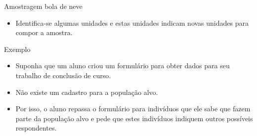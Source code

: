 \documentclass[
  ignorenonframetext,
  serif,
  professionalfont,
  usenames,
  dvipsnames,
  aspectratio = 169]{beamer}
\providecommand{\tightlist}{%
  \setlength{\itemsep}{0pt}\setlength{\parskip}{0pt}}
\renewcommand{\tightlist}{%
  \setlength{\itemsep}{0\baselineskip}
  \setlength{\parskip}{0.25\baselineskip}
}
\begin{document}
\begin{frame}{Amostragem bola de neve}
\protect\hypertarget{amostragem-bola-de-neve}{}
\begin{itemize}
\tightlist
\item
  Identifica-se algumas unidades e estas unidades indicam novas unidades
  para compor a amostra.
\end{itemize}

Exemplo

\begin{itemize}
\item
  Suponha que um aluno criou um formulário para obter dados para seu
  trabalho de conclusão de curso.
\item
  Não existe um cadastro para a população alvo.
\item
  Por isso, o aluno repassa o formulário para indivíduos que ele sabe
  que fazem parte da população alvo e pede que estes indivíduos indiquem
  outros possíveis respondentes.
\end{itemize}
\end{frame}
\end{document}

